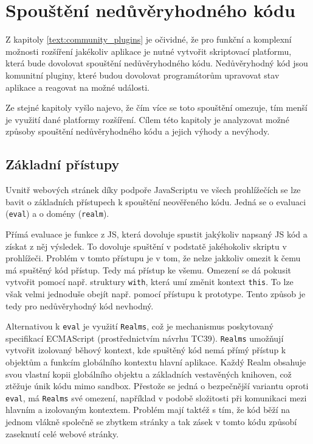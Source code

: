 \section{Spouštění nedůvěryhodného kódu}

Z kapitoly \ref{text:community_plugins} je očividné, že pro funkční a komplexní možnosti rozšíření jakékoliv aplikace je nutné vytvořit skriptovací platformu, která bude dovolovat spouštění nedůvěryhodného kódu.
Nedůvěryhodný kód jsou komunitní pluginy, které budou dovolovat programátorům upravovat stav aplikace a reagovat na možné události.

Ze stejné kapitoly vyšlo najevo, že čím více se toto spouštění omezuje, tím menší je využití dané platformy rozšíření.
Cílem této kapitoly je analyzovat možné způsoby spouštění nedůvěryhodného kódu a jejich výhody a nevýhody.

\subsection{Základní přístupy}

Uvnitř webových stránek díky podpoře JavaScriptu ve všech prohlížečích se lze bavit o základních přístupech k spouštění neověřeného kódu.
Jedná se o evaluaci (\texttt{eval}) a o domény (\texttt{realm}).

Přímá evaluace je funkce z JS, která dovoluje spustit jakýkoliv napsaný JS kód a získat z něj výsledek.
To dovoluje spuštění v podstatě jakéhokoliv skriptu v prohlížeči.
Problém v tomto přístupu je v tom, že nelze jakkoliv omezit k čemu má spuštěný kód přístup.
Tedy má přístup ke všemu.
Omezení se dá pokusit vytvořit pomocí např. struktury \texttt{with}, která umí změnit kontext \texttt{this}.
To lze však velmi jednoduše obejít např. pomocí přístupu k prototype.
Tento způsob je tedy pro nedůvěryhodný kód nevhodný.

Alternativou k \texttt{eval} je využití \texttt{Realms}, což je mechanismus poskytovaný specifikací ECMAScript (prostřednictvím návrhu TC39). 
\texttt{Realms} umožňují vytvořit izolovaný běhový kontext, kde spuštěný kód nemá přímý přístup k objektům a funkcím globálního kontextu hlavní aplikace.
Každý Realm obsahuje svou vlastní kopii globálního objektu a základních vestavěných knihoven, což ztěžuje únik kódu mimo sandbox.
Přestože se jedná o bezpečnější variantu oproti \texttt{eval}, má \texttt{Realms} své omezení, například v podobě složitosti při komunikaci mezi hlavním a izolovaným kontextem. 
Problém mají taktéž s tím, že kód běží na jednom vlákně společně se zbytkem stránky a tak zásek v tomto kódu způsobí zaseknutí celé webové stránky.

